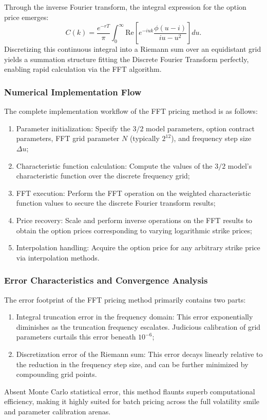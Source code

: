 Through the inverse Fourier transform, the integral expression for the option price emerges:
\begin{equation}
  C(k) = \frac{e^{-rT}}{\pi} \int_0^\infty \text{Re}\left[ e^{-i u k} \frac{\phi(u - i)}{iu - u^2} \right] du.
\end{equation}
Discretizing this continuous integral into a Riemann sum over an equidistant grid yields a summation structure fitting the Discrete Fourier Transform perfectly, enabling rapid calculation via the FFT algorithm.

\subsubsection{Numerical Implementation Flow}
The complete implementation workflow of the FFT pricing method is as follows:
\begin{enumerate}
    \item Parameter initialization: Specify the $3/2$ model parameters, option contract parameters, FFT grid parameter $N$ (typically $2^{12}$), and frequency step size $\Delta u$;
    \item Characteristic function calculation: Compute the values of the $3/2$ model's characteristic function over the discrete frequency grid;
    \item FFT execution: Perform the FFT operation on the weighted characteristic function values to secure the discrete Fourier transform results;
    \item Price recovery: Scale and perform inverse operations on the FFT results to obtain the option prices corresponding to varying logarithmic strike prices;
    \item Interpolation handling: Acquire the option price for any arbitrary strike price via interpolation methods.
\end{enumerate}

\subsubsection{Error Characteristics and Convergence Analysis}
The error footprint of the FFT pricing method primarily contains two parts:
\begin{enumerate}
  \item Integral truncation error in the frequency domain: This error exponentially diminishes as the truncation frequency escalates. Judicious calibration of grid parameters curtails this error beneath $10^{-6}$;
  \item Discretization error of the Riemann sum: This error decays linearly relative to the reduction in the frequency step size, and can be further minimized by compounding grid points.
\end{enumerate}
Absent Monte Carlo statistical error, this method flaunts superb computational efficiency, making it highly suited for batch pricing across the full volatility smile and parameter calibration arenas.

